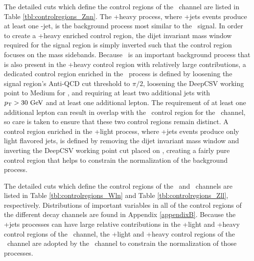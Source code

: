 The detailed cuts which define the control regions of the \ZnnH\ channel are listed in Table \ref{tbl:controlregions_Znn}. The \bosZ+heavy process, where \bosZ+jets events produce at least one \qrkb-jet, is the background process most similar to the \ZnnH\ signal. In order to create a \bosZ+heavy enriched control region, the dijet invariant mass window required for the signal region is simply inverted such that the control region focuses on the mass sidebands. Because \qrkt\qrktbar\ is an important background process that is also present in the \bosZ+heavy control region with relatively large contributions, a dedicated control region enriched in the \qrkt\qrktbar\ process is defined by loosening the signal region's Anti-QCD cut threshold to $\pi/2$, loosening the DeepCSV working point to Medium for \btagmax, and requiring at least two additional jets with $\pT > 30\ \GeV$ and at least one additional lepton. The requirement of at least one additional lepton can result in overlap with the \qrkt\qrktbar\ control region for the \WlnH\ channel, so care is taken to ensure that these two control regions remain distinct. A control region enriched in the \bosZ+light process, where \bosZ+jets events produce only light flavored jets, is defined by removing the dijet invariant mass window and inverting the DeepCSV working point cut placed on \btagmax, creating a fairly pure control region that helps to constrain the normalization of the background process.

The detailed cuts which define the control regions of the \WlnH\ and \ZllH\ channels are listed in Table \ref{tbl:controlregions_Wln} and Table \ref{tbl:controlregions_Zll}, respectively.  Distributions of important variables in all of the control regions of the different decay channels are found in Appendix \ref{appendixB}. Because the \bosW+jets processes can have large relative contributions in the \bosZ+light and \bosZ+heavy control regions of the \ZnnH\ channel, the \bosW+light and \bosW+heavy control regions of the \WlnH\ channel are adopted by the \ZnnH\ channel to constrain the normalization of those processes.

